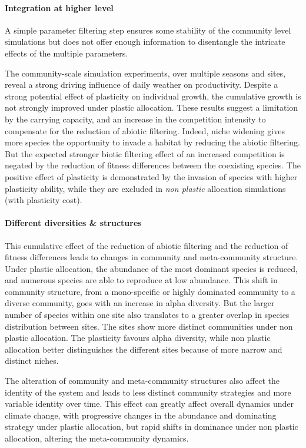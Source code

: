 \paragraph{Integration at higher level}

A simple parameter filtering step ensures some stability of the community level simulations but does not offer enough information to disentangle the intricate effects of the multiple parameters. 

The community-scale simulation experiments, over multiple seasons and sites, reveal a strong driving influence of daily weather on productivity. Despite a strong potential effect of plasticity on individual growth, the cumulative growth is not strongly improved under plastic allocation. These results suggest a limitation by the carrying capacity, and an increase in the competition intensity to compensate for the reduction of abiotic filtering. Indeed, niche widening gives more species the opportunity to invade a habitat by reducing the abiotic filtering. But the expected stronger biotic filtering effect of an increased competition is negated by the reduction of fitness differences between the coexisting species. The positive effect of plasticity is demonstrated by the invasion of species with higher plasticity ability, while they are excluded in \textit{non plastic} allocation simulations (with plasticity cost).


\paragraph{Different diversities \& structures}
This cumulative effect of the reduction of abiotic filtering and the reduction of fitness differences leads to changes in community and meta-community structure. Under plastic allocation, the abundance of the most dominant species is reduced, and numerous species are able to reproduce at low abundance. This shift in community structure, from a mono-specific or highly dominated community to a diverse community, goes with an increase in alpha diversity. But the larger number of species within one site also translates to a greater overlap in species distribution between sites. The sites show more distinct communities under non plastic allocation. The plasticity favours alpha diversity, while non plastic allocation better distinguishes the different sites because of more narrow and distinct niches.

The alteration of community and meta-community structures also affect the identity of the system and leads to less distinct community strategies and more variable identity over time. This effect can greatly affect overall dynamics under climate change, with progressive changes in the abundance and dominating strategy under plastic allocation, but rapid shifts in dominance under non plastic allocation, altering the meta-community dynamics.


